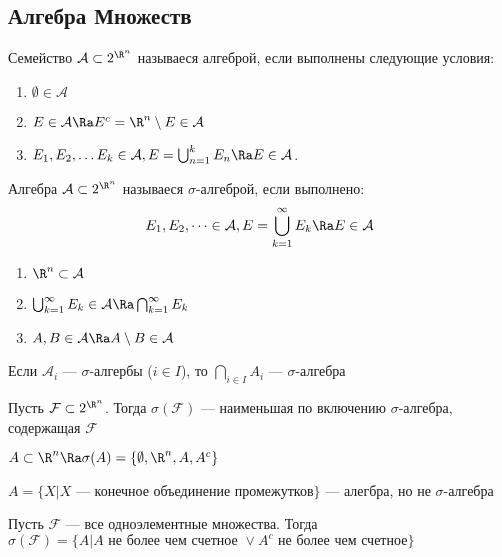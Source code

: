 \subsection{Алгебра Множеств}
\begin{definition}
    Семейство \(\mathcal{A} \subset 2^{\R^n}\) называеся алгеброй, если выполнены следующие условия:
    \begin{enumerate}
        \item \(\emptyset \in \mathcal{A}\)
        \item \(E \in \mathcal{A} \Ra E^c = \R^n \setminus E \in \mathcal{A}\)
        \item \(E_1, E_2, \dots E_k \in \mathcal{A}, E = \bigcup^k_{n = 1} E_n \Ra E \in \mathcal{A}\).
    \end{enumerate}
\end{definition}

\begin{definition}
    Алгебра \(\mathcal{A} \subset 2^{\R^n}\) называеся \(\sigma\)-алгеброй, если выполнено:
    \[E_1, E_2, \dots \in \mathcal{A}, E = \bigcup^\infty_{k = 1} E_k \Ra E \in \mathcal{A}\]
\end{definition}

\begin{note}
    \begin{enumerate}
        \item \(\R^n \subset \mathcal{A}\)
        \item \(\bigcup^\infty_{k = 1} E_k \in \mathcal{A} \Ra \bigcap^\infty_{k = 1} E_k\)
        \item \(A, B \in \mathcal{A} \Ra A \setminus B \in \mathcal{A}\)
    \end{enumerate}
\end{note}

\begin{note}
    Если \(\mathcal{A}_i\) --- \(\sigma\)-алгербы (\(i \in I\)), то \(\bigcap_{i \in I} A_i\) --- \(\sigma\)-алгебра
\end{note}

\begin{definition}
    Пусть \(\mathcal{F} \subset 2^{\R^n}\). Тогда \(\sigma(\mathcal{F})\) --- наименьшая по включению \(\sigma\)-алгебра, содержащая \(\mathcal{F}\)
\end{definition}

\begin{example}
    \(A \subset \R^n \Ra \sigma(A) = \{\emptyset, \R^n, A, A^c\}\)
\end{example}
\begin{example}
    \(A = \{X | X \text{ --- конечное объединение промежутков}\}\) --- алегбра, но не \(\sigma\)-алгебра
\end{example}
\begin{example}
    Пусть \(\mathcal{F}\) --- все одноэлементные множества. Тогда 
    \(\sigma(\mathcal{F}) = \{A | A \text{ не более чем счетное } \vee A^c \text{ не более чем счетное}\}\)
\end{example}

